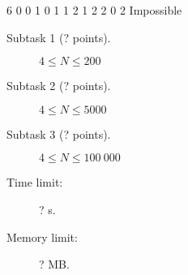 \documentclass{boi2014}
\begin{document}
	\example
	{
		6
		0 0
		1 0
		1 1
		2 1
		2 2
		0 2
	}
	{
		Impossible
	}

    \Scoring

    \begin{description}
        \item[Subtask 1 (? points).] $4 \le N \le 200$
        \item[Subtask 2 (? points).] $4 \le N \le 5000$
        \item[Subtask 3 (? points).] $4 \le N \le 100\ 000$
    \end{description}

    \Constraints

    \begin{description}
        \item[Time limit:] ? s.
        \item[Memory limit:] ? MB.
    \end{description}
\end{document}
